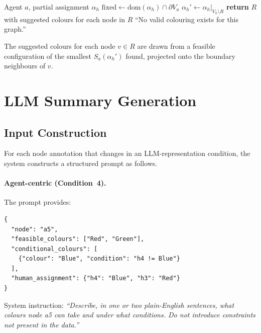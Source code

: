 \documentclass[10pt]{article}
\theoremstyle{definition}
\begin{document}
\begin{algorithm}
\caption{InfeasibilityRepair: minimal node set to restore feasibility}
\label{alg:repair}
\begin{algorithmic}[1]
\REQUIRE Agent $a$, partial assignment $\alpha_h$
\STATE $\mathrm{fixed} \gets \mathrm{dom}(\alpha_h) \cap \partial V_a$
    \STATE $\alpha_h' \gets \alpha_h|_{V_h \setminus R}$
      \STATE \textbf{return} $R$ with suggested colours for each node in $R$
    \ENDIF
  \ENDFOR
\ENDFOR
\RETURN ``No valid colouring exists for this graph.''
\end{algorithmic}
\end{algorithm}

The suggested colours for each node $v \in R$ are drawn from a feasible configuration of the
smallest $S_a(\alpha_h')$ found, projected onto the boundary neighbours of $v$.

\section{LLM Summary Generation}
\label{app:llmdetail}

\subsection{Input Construction}

For each node annotation that changes in an LLM-representation condition, the system constructs
a structured prompt as follows.

\paragraph{Agent-centric (Condition~4).}
The prompt provides:
\begin{lstlisting}
{
  "node": "a5",
  "feasible_colours": ["Red", "Green"],
  "conditional_colours": [
    {"colour": "Blue", "condition": "h4 != Blue"}
  ],
  "human_assignment": {"h4": "Blue", "h3": "Red"}
}
\end{lstlisting}
System instruction: \emph{``Describe, in one or two plain-English sentences, what colours node
a5 can take and under what conditions. Do not introduce constraints not present in the data.''}
\end{document}
